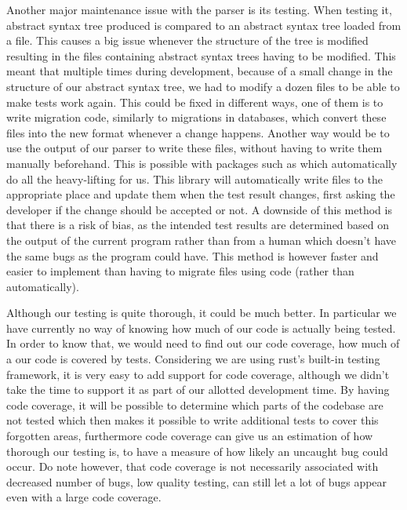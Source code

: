 \documentclass{article}
\begin{document}
Another major maintenance issue with the parser is its testing. When testing
it, abstract syntax tree produced is compared to an abstract syntax tree loaded
from a file. This causes a big issue whenever the structure of the tree is
modified resulting in the files containing abstract syntax trees having to be
modified. This meant that multiple times during development, because of a
small change in the structure of our abstract syntax tree, we had to modify a dozen files
to be able to make tests work again. This could be fixed in different ways, one of
them is to write migration code, similarly to migrations in databases, which
convert these files into the new format whenever a change happens. Another way
would be to use the output of our parser to write these files, without having
to write them manually beforehand. This is possible with packages such as
 which automatically do all the heavy-lifting for us. This
library will automatically write files to the appropriate place and update them
when the test result changes, first asking the developer if the change should
be accepted or not. A downside of this method is that there is a risk of bias,
as the intended test results are determined based on the output of the current
program rather than from a human which doesn't have the same bugs as the
program could have. This method is however faster and easier to implement than
having to migrate files using code (rather than automatically).

Although our testing is quite thorough, it could be much better. In particular
we have currently no way of knowing how much of our code is actually being
tested. In order to know that, we would need to find out our code coverage, how
much of a our code is covered by tests. Considering we are using rust's
built-in testing framework, it is very easy to add support for code coverage,
although we didn't take the time to support it as part of our allotted
development time. By having code coverage, it will be possible to determine
which parts of the codebase are not tested which then makes it possible to
write additional tests to cover this forgotten areas, furthermore code coverage
can give us an estimation of how thorough our testing is, to have a measure of
how likely an uncaught bug could occur. Do note however, that code coverage is
not necessarily associated with decreased number of bugs, low quality testing,
can still let a lot of bugs appear even with a large code coverage.
\end{document}
